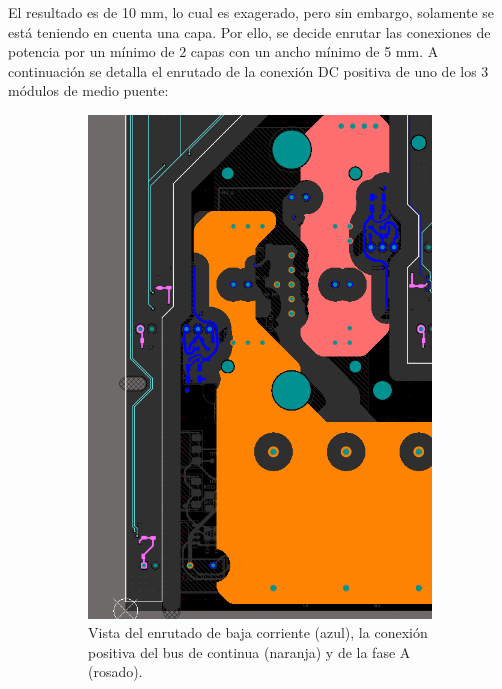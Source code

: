 El resultado es de 10 mm, lo cual es exagerado, pero sin embargo, solamente se está teniendo en cuenta una capa. Por ello, se decide enrutar las conexiones de potencia por un mínimo de 2 capas con un ancho mínimo de 5 mm. A continuación se detalla el enrutado de la conexión DC positiva de uno de los 3 módulos de medio puente:

\begin{figure}[H]
	\centering
	\begin{subfigure}{0.45\linewidth}
		\centering
		\includegraphics[width=\linewidth]{fig/ts+bot}
		\caption{Vista del enrutado de baja corriente (azul), la conexión positiva del bus de continua (naranja) y de la fase A (rosado).}
	\end{subfigure}
	\hfill
	\begin{subfigure}{0.42\linewidth}
		\centering

\end{subfigure}
\end{figure}
